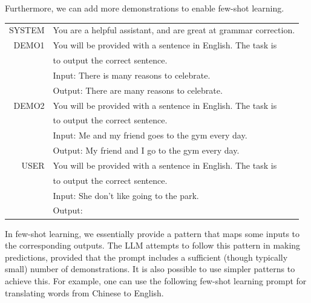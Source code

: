 Furthermore, we can add more demonstrations to enable few-shot learning.

\vspace{0.5em}
\begin{tcolorbox}

\begingroup
\renewcommand{\arraystretch}{1.0}
\setlength{\tabcolsep}{6pt}
\begin{tabular}{r l}
{\color{gray} \footnotesize{SYSTEM}} & You are a helpful assistant, and are great at grammar correction. \\ [0.2cm]
{\color{gray} \footnotesize{DEMO1}}  & You will be provided with a sentence in English. The task is \\
 & to output the correct sentence. \\ [0.1cm]
 & Input: There is many reasons to celebrate. \\
 & Output: There are many reasons to celebrate. \\ [0.2cm]
{\color{gray} \footnotesize{DEMO2}}  & You will be provided with a sentence in English. The task is \\
 & to output the correct sentence. \\ [0.1cm]
 & Input: Me and my friend goes to the gym every day. \\
 & Output: My friend and I go to the gym every day. \\ [0.2cm]
{\color{gray} \footnotesize{USER}}  & You will be provided with a sentence in English. The task is \\
 & to output the correct sentence. \\ [0.1cm]
 & Input: She don't like going to the park. \\
 & Output: \underline{\hspace{2em}}
\end{tabular}
\endgroup

\end{tcolorbox}
\vspace{0.5em}

In few-shot learning, we essentially provide a pattern that maps some inputs to the corresponding outputs. The LLM attempts to follow this pattern in making predictions, provided that the prompt includes a sufficient (though typically small) number of demonstrations. It is also possible to use simpler patterns to achieve this. For example, one can use the following few-shot learning prompt for translating words from Chinese to English.

